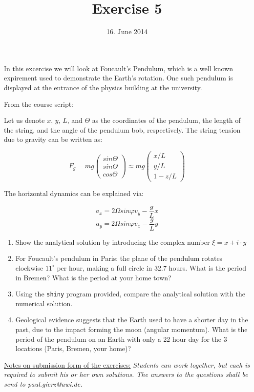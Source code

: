 \documentclass[a4paper,12pt]{article}
\title{Exercise 5}
\date{16. June 2014}
\begin{document}
\maketitle
\thispagestyle{fancy}

In this excercise we will look at Foucault's Pendulum, which is a well known expirement
used to demonstrate the Earth's rotation. One such pendulum is
displayed at the entrance of the physics building at the university.

From the course script:

Let us denote $x$, $y$, $L$, and $\Theta$ as the coordinates of the
pendulum, the length of the string, and the angle of the pendulum bob,
respectively. The string tension due to gravity can be written as:

\begin{equation}
F_{g} = mg \left (\begin{array}{c} sin{\Theta} \\ sin{\Theta} \\
    cos{\Theta} \end{array} \right ) \approx mg \left (\begin{array}{c} x/L \\ y/L \\
    1-z/L \end{array} \right )
\end{equation} 

The horizontal dynamics can be explained via:

\begin{equation}
a_x = 2\Omega sin \varphi v_y - \frac{g}{L}x 
\end{equation}
\begin{equation}
a_y = 2\Omega sin \varphi v_x - \frac{g}{L}y
\end{equation}


\begin{enumerate}

\item Show the analytical solution by introducing the complex number
  $\xi = x + i \cdot y$

\item For Foucault's pendulum in Paris: the plane of the pendulum
  rotates clockwise $11^{\circ}$ per hour, making a full circle in
  32.7 hours. What is the period in Bremen?  What is the period at
  your home town?

\item Using the \texttt{shiny} program provided, compare the
  analytical solution with the numerical solution.

\item Geological evidence suggests that the Earth used to have a
  shorter day in the past, due to the impact forming the moon (angular
  momentum). What is
  the period of the pendulum on an Earth with only a 22 hour day for
  the 3 locations (Paris, Bremen, your home)?
\end{enumerate}


\vfill
\underline{Notes on submission form of the exercises:}
 \textit{Students can work together, but each is required to submit
   his or her own solutions. The answers to the questions shall be send to paul.gierz@awi.de.}
\end{document}
